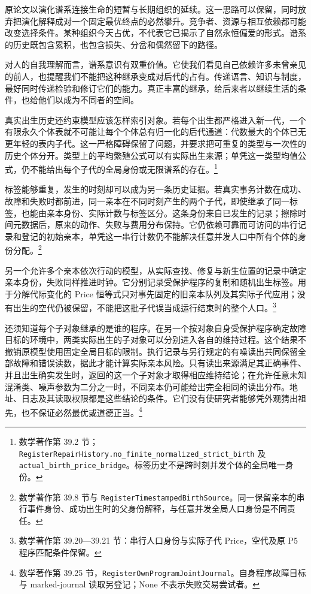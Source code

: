 \documentclass[
  11pt,
  oneside]{book}
\begin{document}
原论文以演化谱系连接生命的短暂与长期组织的延续。这一思路可以保留，同时放弃把演化解释成对一个固定最优终点的必然攀升。竞争者、资源与相互依赖都可能改变选择条件。某种组织今天占优，不代表它已揭示了自然永恒偏爱的形式。谱系的历史既包含累积，也包含损失、分岔和偶然留下的路径。

对人的自我理解而言，谱系意识有双重价值。它使我们看见自己依赖许多未曾亲见的前人，也提醒我们不能把这种继承变成对后代的占有。传递语言、知识与制度，最好同时传递检验和修订它们的能力。真正丰富的继承，给后来者以继续生活的条件，也给他们以成为不同者的空间。

真实出生历史还约束模型应该怎样索引对象。若每个出生都严格进入新一代，一个有限永久个体表就不可能让每个个体总有归一化的后代通道：代数最大的个体已无更年轻的表内子代。这一严格障碍保留了问题，并要求把可重复的类型与一次性的历史个体分开。类型上的平均繁殖公式可以有实际出生来源；单凭这一类型均值公式，仍不能给出每个子代的全局身份或无限谱系的存在。\footnote{\hypertarget{ph-note-46}{}数学著作第 39.2 节；\nolinkurl{RegisterRepairHistory.no_finite_normalized_strict_birth} 及 \nolinkurl{actual_birth_price_bridge}。标签历史不是跨时刻并发个体的全局唯一身份。}

标签能够重复，发生的时刻却可以成为另一条历史证据。若真实事务计数在成功、故障和失败时都前进，同一亲本在不同时刻产生的两个子代，即使继承了同一标签，也能由亲本身份、实际计数与标签区分。这条身份来自已发生的记录；擦除时间元数据后，原来的动作、失败与费用分布保持。它仍依赖可靠而可访问的串行记录和登记的初始亲本，单凭这一串行计数仍不能解决任意并发人口中所有个体的身份分配。\footnote{\hypertarget{ph-note-47}{}数学著作第 39.8 节与 \nolinkurl{RegisterTimestampedBirthSource}。同一保留亲本的串行事件身份、成功出生时的父身份解释，与任意并发全局人口身份是不同责任。}

另一个允许多个亲本依次行动的模型，从实际查找、修复与新生位置的记录中确定亲本身份，失败同样推进时钟。它分别记录受保护程序的复制和随机出生标签。用于分解代际变化的 Price 恒等式只对事先固定的旧亲本队列及其实际子代应用；没有出生的空代仍被保留，不能把这批子代误当成运行结束时的整个人口。\footnote{\hypertarget{ph-note-48}{}数学著作第 39.20---39.21 节：串行人口身份与实际子代 Price，空代及原 P5 程序匹配条件保留。}

还须知道每个子对象继承的是谁的程序。在另一个按对象自身受保护程序确定故障目标的环境中，两类实际出生的子对象可以分别进入各自的维持过程。这个结果不撤销原模型使用固定全局目标的限制。执行记录与另行规定的有噪读出共同保留全部故障和错误读数，据此才能计算实际亲本风险。只有读出来源满足其正确事件、并且出生确实发生时，返回的这一个子对象才取得相应维持结论；在允许任意未知混淆类、噪声参数为二分之一时，不同亲本仍可能给出完全相同的读出分布。地址、日志及其读取权限都是这些结论的条件。它们没有使研究者能够凭外观猜出祖先，也不保证必然最优或道德正当。\footnote{\hypertarget{ph-note-49}{}数学著作第 39.25 节，\nolinkurl{RegisterOwnProgramJointJournal}。自身程序故障目标与 marked-journal 读取另登记；None 不表示失败交易尝试者。}
\end{document}
